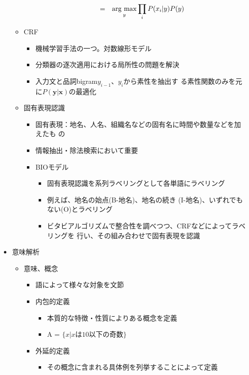 \documentclass[a4j,11pt]{jsarticle}
\newcommand{\argmax}{\mathop{\rm arg~max}\limits}
\begin{document}
\begin{itemize}
\begin{itemize}
\begin{itemize}
\begin{eqnarray*}
&=& \argmax_{y} \prod_i{P(x_i|y)P(y)}
		     \end{eqnarray*}
	      \end{itemize}
	\item CRF
	      \begin{itemize}
	       \item 機械学習手法の一つ。対数線形モデル
	       \item 分類器の逐次適用における局所性の問題を解決
	       \item 入力文と品詞bigram$y_{i-1}$、$y_i$から素性を抽出す
		     る素性関数のみを元に$P(\bm{y}|\bm{x})$の最適化
	      \end{itemize}
	\item 固有表現認識
	      \begin{itemize}
	       \item 固有表現：地名、人名、組織名などの固有名に時間や数量などを加えたも
		     の
	       \item 情報抽出・除法検索において重要
	       \item BIOモデル
		     \begin{itemize}
		      \item 固有表現認識を系列ラベリングとして各単語にラベリング
		      \item 例えば、地名の始点(B-地名)、地名の続き
			    (I-地名)、いずれでもない(O)とラベリング
		      \item ビタビアルゴリズムで整合性を調べつつ、CRFなどによってラベリングを
			    行い、その組み合わせで固有表現を認識
		     \end{itemize}
	      \end{itemize}
       \end{itemize}
 \item 意味解析
       \begin{itemize}
	\item 意味、概念
	      \begin{itemize}
	       \item 語によって様々な対象を文節
	       \item 内包的定義
		     \begin{itemize}
		      \item 本質的な特徴・性質によりある概念を定義
		      \item A = $\{x|xは10以下の奇数\}$
		     \end{itemize}
	       \item 外延的定義
		     \begin{itemize}
		      \item その概念に含まれる具体例を列挙することによって定義

\end{itemize}
\end{itemize}
\end{itemize}
\end{itemize}
\end{document}
